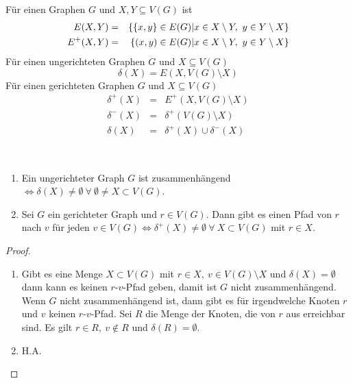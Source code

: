 \begin{definition}
	Für einen Graphen $G$ und $X,Y\subseteq V(G)$ ist
	\begin{eqnarray*}
		E(X,Y) &=& \{\{x,y\}\in E(G)\vert x \in X\setminus Y,~y \in Y\setminus X\}\\
		E^+(X,Y) &=& \{(x,y)\in E(G)\vert x \in X\setminus Y,~y \in Y\setminus X\}
	\end{eqnarray*}
	Für einen ungerichteten Graphen $G$ und $X \subseteq V(G)$
	\begin{equation*}
	\delta(X) = E(X, V(G)\setminus X)
	\end{equation*}
	Für einen gerichteten Graphen $G$ und $X\subseteq V(G)$
	\begin{eqnarray*}
		\delta^+(X) &=& E^+(X, V(G)\setminus X)\\
		\delta^-(X) &=& \delta^+(V(G)\setminus X)\\
		\delta(X) &=& \delta^+(X) \cup \delta^-(X)
	\end{eqnarray*}
\end{definition}
\begin{lemma}~
	\begin{enumerate}[label=\alph*)]
		\item Ein ungerichteter Graph $G$ ist zusammenhängend $\Leftrightarrow \delta(X) \neq \emptyset~ \forall ~\emptyset \neq X \subset V(G)$.
		\item Sei $G$ ein gerichteter Graph und $r \in V(G)$. Dann gibt es einen Pfad von $r$ nach $v$ für jeden $v \in V(G) \Leftrightarrow \delta^+(X) \neq \emptyset~\forall~X\subset V(G)$ mit $r\in X$.
	\end{enumerate}
\end{lemma}
\begin{proof}~
	\begin{enumerate}[label=\alph*)]
		\item Gibt es eine Menge $X\subset V(G)$ mit $r\in X,~v\in V(G)\setminus X$ und $\delta(X) = \emptyset$ dann kann es keinen $r$-$v$-Pfad geben, damit ist $G$ nicht zusammenhängend. Wenn $G$ nicht zusammenhängend ist, dann gibt es für irgendwelche Knoten $r$ und $v$ keinen $r$-$v$-Pfad. Sei $R$ die Menge der Knoten, die von $r$ aus erreichbar sind. Es gilt $r\in R,~v\notin R$ und $\delta(R)=\emptyset$.
		\item H.A.
	\end{enumerate}
\end{proof}

